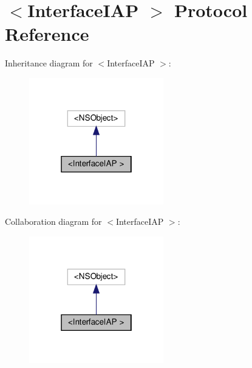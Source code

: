 \hypertarget{protocolInterfaceIAP_01-p}{}\section{$<$Interface\+I\+AP $>$ Protocol Reference}
\label{protocolInterfaceIAP_01-p}


Inheritance diagram for $<$Interface\+I\+AP $>$\+:
\nopagebreak
\begin{figure}[H]
\begin{center}
\leavevmode
\includegraphics[width=166pt]{protocolInterfaceIAP_01-p__inherit__graph}
\end{center}
\end{figure}


Collaboration diagram for $<$Interface\+I\+AP $>$\+:
\nopagebreak
\begin{figure}[H]
\begin{center}
\leavevmode
\includegraphics[width=166pt]{protocolInterfaceIAP_01-p__coll__graph}
\end{center}
\end{figure}
